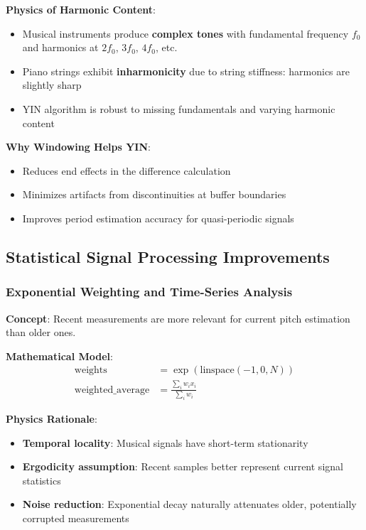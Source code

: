 \documentclass[11pt,a4paper]{article}
\begin{document}
\textbf{Physics of Harmonic Content}:
\begin{itemize}
    \item Musical instruments produce \textbf{complex tones} with fundamental frequency $f_0$ and harmonics at $2f_0$, $3f_0$, $4f_0$, etc.
    \item Piano strings exhibit \textbf{inharmonicity} due to string stiffness: harmonics are slightly sharp
    \item YIN algorithm is robust to missing fundamentals and varying harmonic content
\end{itemize}

\textbf{Why Windowing Helps YIN}:
\begin{itemize}
    \item Reduces end effects in the difference calculation
    \item Minimizes artifacts from discontinuities at buffer boundaries
    \item Improves period estimation accuracy for quasi-periodic signals
\end{itemize}

\subsection{Statistical Signal Processing Improvements}

\subsubsection{Exponential Weighting and Time-Series Analysis}

\textbf{Concept}: Recent measurements are more relevant for current pitch estimation than older ones.

\textbf{Mathematical Model}:
\begin{align}
\text{weights} &= \exp(\text{linspace}(-1, 0, N)) \\
\text{weighted\_average} &= \frac{\sum_i w_i x_i}{\sum_i w_i}
\end{align}

\textbf{Physics Rationale}:
\begin{itemize}
    \item \textbf{Temporal locality}: Musical signals have short-term stationarity
    \item \textbf{Ergodicity assumption}: Recent samples better represent current signal statistics
    \item \textbf{Noise reduction}: Exponential decay naturally attenuates older, potentially corrupted measurements
\end{itemize}
\end{document}
